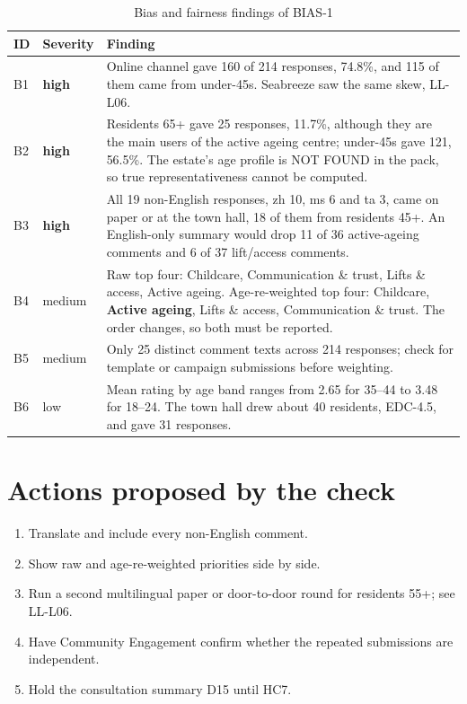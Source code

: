 \begin{table}[htbp]
\centering
\small
\caption{Bias and fairness findings of BIAS-1}
\label{tab:bias}
\begin{tabularx}{\textwidth}{>{\raggedright\arraybackslash}p{0.7cm}>{\raggedright\arraybackslash}p{1.5cm}>{\raggedright\arraybackslash}X}
\toprule
\textbf{ID} & \textbf{Severity} & \textbf{Finding} \\
\midrule
B1 & \textcolor{pmOrange}{\textbf{high}} & Online channel gave 160 of 214 responses, 74.8\%, and 115 of them came from under-45s. Seabreeze saw the same skew, LL-L06. \\
B2 & \textcolor{pmOrange}{\textbf{high}} & Residents 65+ gave 25 responses, 11.7\%, although they are the main users of the active ageing centre; under-45s gave 121, 56.5\%. The estate's age profile is NOT FOUND in the pack, so true representativeness cannot be computed. \\
B3 & \textcolor{pmOrange}{\textbf{high}} & All 19 non-English responses, zh 10, ms 6 and ta 3, came on paper or at the town hall, 18 of them from residents 45+. An English-only summary would drop 11 of 36 active-ageing comments and 6 of 37 lift/access comments. \\
B4 & medium & Raw top four: Childcare, Communication \& trust, Lifts \& access, Active ageing. Age-re-weighted top four: Childcare, \textbf{Active ageing}, Lifts \& access, Communication \& trust. The order changes, so both must be reported. \\
B5 & medium & Only 25 distinct comment texts across 214 responses; check for template or campaign submissions before weighting. \\
B6 & low & Mean rating by age band ranges from 2.65 for 35--44 to 3.48 for 18--24. The town hall drew about 40 residents, EDC-4.5, and gave 31 responses. \\
\bottomrule
\end{tabularx}
\end{table}



\section{Actions proposed by the check}

\begin{enumerate}
\item Translate and include every non-English comment.
\item Show raw and age-re-weighted priorities side by side.
\item Run a second multilingual paper or door-to-door round for residents 55+; see LL-L06.
\item Have Community Engagement confirm whether the repeated submissions are independent.
\item Hold the consultation summary D15 until HC7.
\end{enumerate}

